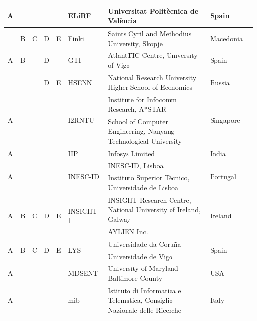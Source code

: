 \documentclass[11pt,letterpaper]{article}
\begin{document}
\begin{table}[htb]
\begin{center}
{\begin{tabular}{|ccccc|l|l|l|l|}
      A & & & & & ELiRF & Universitat Politècnica de València & Spain &  \\ \hline 
      & B & C & D & E & Finki & 
      Saints Cyril and Methodius University, Skopje & Macedonia & \cite{SemEval:2016:task4:Finki} \\ \hline 
      A & B & & D & & GTI & AtlantTIC Centre, University of Vigo & Spain & \cite{SemEval:2016:task4:GTI} \\ \hline 
      & & & D & E & HSENN & National Research University Higher School of Economics & Russia &  \\ \hline 
      \multirow{2}{*}{A} & & & & & \multirow{2}{*}{I2RNTU} & Institute for Infocomm Research, A*STAR & \multirow{2}{*}{Singapore} & \multirow{2}{*}{\cite{SemEval:2016:task4:I2RNTU}} \\ 
      & & & & & & School of Computer Engineering, Nanyang Technological University & & \\ \hline 
      A & & & & & IIP & Infosys Limited & India & \cite{SemEval:2016:task4:IIP} \\ \hline 
      \multirow{2}{*}{A} & & & & & \multirow{2}{*}{INESC-ID} & INESC-ID, Lisboa & \multirow{2}{*}{Portugal} & \multirow{2}{*}{\cite{SemEval:2016:task4:INESC-ID}} \\ 
      & & & & & & Instituto Superior Técnico, Universidade de Lisboa & & \\ \hline 
      \multirow{2}{*}{A} & \multirow{2}{*}{B} & \multirow{2}{*}{C} & \multirow{2}{*}{D} & \multirow{2}{*}{E} & \multirow{2}{*}{INSIGHT-1} & INSIGHT Research Centre, National University of Ireland, Galway & \multirow{2}{*}{Ireland} & \multirow{2}{*}{\cite{SemEval:2016:task4:INSIGHT-1}} \\ 
      & & & & & & AYLIEN Inc. & & \\ \hline 
      \multirow{2}{*}{A} & \multirow{2}{*}{B} & \multirow{2}{*}{C} & \multirow{2}{*}{D} & \multirow{2}{*}{E} & \multirow{2}{*}{LYS} & Universidade da Coruña & \multirow{2}{*}{Spain} & \multirow{2}{*}{\cite{SemEval:2016:task4:LYS}} \\ 
      & & & & & & Universidade de Vigo & & \\ \hline 
      A & & & & & MDSENT & University of Maryland Baltimore County & USA & \cite{SemEval:2016:task4:MDSENT} \\ \hline 
      A & & & & & mib & Istituto di Informatica e Telematica, Consiglio Nazionale delle Ricerche & Italy & \cite{SemEval:2016:task4:mib} \\ \hline 

\end{tabular}}
\end{center}
\end{table}
\end{document}
